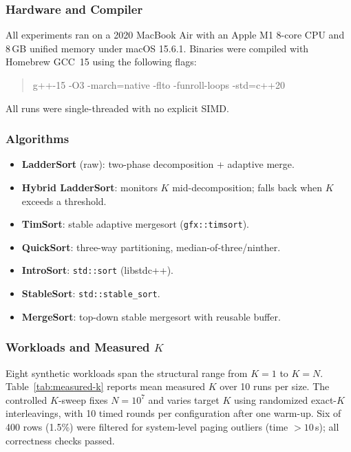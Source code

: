 \documentclass{ieeeaccess}
\theoremstyle{plain}
\theoremstyle{definition}
\begin{document}
\subsubsection{Hardware and Compiler}

All experiments ran on a 2020 MacBook Air with an Apple M1 8-core CPU and
8\,GB unified memory under macOS 15.6.1.  Binaries were compiled with
Homebrew GCC~15 using the following flags:
\begin{quote}
\small\ttfamily
g++-15 -O3 -march=native -flto -funroll-loops -std=c++20
\end{quote}
All runs were single-threaded with no explicit SIMD.

\subsubsection{Algorithms}

\begin{itemize}
  \item \textbf{LadderSort} (raw): two-phase decomposition + adaptive merge.
  \item \textbf{Hybrid LadderSort}: monitors $K$ mid-decomposition; falls back
    when $K$ exceeds a threshold.
  \item \textbf{TimSort}: stable adaptive mergesort (\texttt{gfx::timsort}).
  \item \textbf{QuickSort}: three-way partitioning, median-of-three/ninther.
  \item \textbf{IntroSort}: \texttt{std::sort} (libstdc++).
  \item \textbf{StableSort}: \texttt{std::stable\_sort}.
  \item \textbf{MergeSort}: top-down stable mergesort with reusable buffer.
\end{itemize}

\subsubsection{Workloads and Measured $K$}
\label{sec:workloads}

Eight synthetic workloads span the structural range from $K=1$ to $K=N$.
Table~\ref{tab:measured-k} reports mean measured $K$ over 10 runs per size.
The controlled $K$-sweep fixes $N=10^7$ and varies target $K$ using
randomized exact-$K$ interleavings, with 10 timed rounds per configuration
after one warm-up.  Six of 400 rows (1.5\%) were filtered for system-level
paging outliers (time $> 10$\,s); all correctness checks passed.
\end{document}
